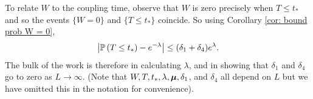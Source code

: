 	To relate $W$ to the coupling time, observe that $W$ is zero precisely when $T \leq t_*$ and so the events $\{W = 0\}$ and $\{T \leq t_*\}$ coincide. So using Corollary \ref{cor: bound prob W = 0},
	\begin{equation}
		\label{eq:bound distribution T}
		\left|\mathbb{P}\left(T \leq t_*\right)  - e^{-\lambda}\right| \leq (\delta_1 + \delta_4) e^\lambda.
	\end{equation}
	The bulk of the work is therefore in calculating $\lambda$, and in showing that $\delta_1$ and $\delta_4$ go to zero as $L \rightarrow \infty$. (Note that $W, T, t_*, \lambda, {\bm{{\mu}}}, \delta_1$, and $\delta_4$ all depend on $L$ but we have omitted this in the notation for convenience).